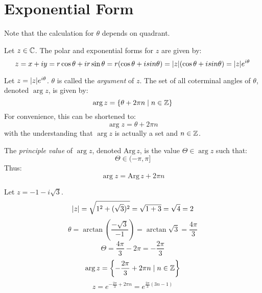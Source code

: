 \documentclass[letterpaper,12pt,fleqn]{article}
\renewcommand{\o}{\theta}
\renewcommand{\O}{\Theta}
\newcommand{\Arg}[1]{\mathrm{Arg}\,#1}
\begin{document}
\section*{Exponential Form}
\begin{figure}[h]
\setlength{\leftskip}{0.5in}
\end{figure}
Note that the calculation for $\o$ depends on quadrant.

\begin{definition}
Let $z\in\mathbb{C}$. The polar and exponential forms for $z$ are given by:
\[z=x+iy=r\cos\o+ir\sin\o=r(\cos\o+isin\o)=\abs{z}(\cos\o+isin\o)=
    \abs{z}e^{i\o}\]
\end{definition}

\begin{definition}
Let $z=\abs{z}e^{i\o}$. $\o$ is called the \emph{argument} of $z$. The set of
all coterminal angles of $\o$, denoted $\arg{z}$, is given by:
\[\arg{z}=\{\o+2\pi n\mid n\in\Z\}\]
For convenience, this can be shortened to:
\[\arg{z}=\o+2\pi n\]
with the understanding that $\arg{z}$ is actually a set and $n\in\mathbb{Z}$.

The \emph{principle value} of $\arg{z}$, denoted $\Arg{z}$, is the value
$\O\in\arg{z}$ such that:
\[\O\in(-\pi,\pi]\]
Thus:
\[\arg{z}=\Arg{z}+2\pi n\]
\end{definition}

\begin{example}
Let $z=-1-i\sqrt{3}$.
\[\lvert z\rvert=\sqrt{1^2+(\sqrt{3})^2}=\sqrt{1+3}=\sqrt{4}=2\]
\[\o=\arctan{\left(\frac{-\sqrt{3}}{-1}\right)}=\arctan{\sqrt{3}}=
    \frac{4\pi}{3}\]
\[\O=\frac{4\pi}{3}-2\pi=-\frac{2\pi}{3}\]
\[\arg{z}=\left\{-\frac{2\pi}{3}+2\pi n\mid n\in\mathbb{Z}\right\}\]
\[z=e^{-\frac{2\pi}{3}+2\pi n}=e^{\frac{2\pi}{3}(3n-1)}\]
\end{example}
\end{document}

